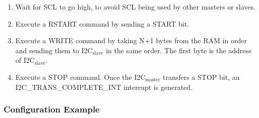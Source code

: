 \documentclass[main\_\_EN.tex]{subfiles}
\begin{document}
\begin{enumerate}
    \item Wait for SCL to go high, to avoid SCL being used by other masters or slaves.
    \item Execute a RSTART command by sending a START bit.
    \item Execute a WRITE command by taking N+1 bytes from the RAM in order and sending them to I2C$_\text{slave}$ in the same order. The first byte is the address of I2C$_\text{slave}$.
    \item Execute a STOP command. Once the I2C$_\text{master}$ transfers a STOP bit, an I2C\_TRANS\_COMPLETE\_INT interrupt is generated.
\end{enumerate}

\subsubsection{Configuration Example}
\end{document}
